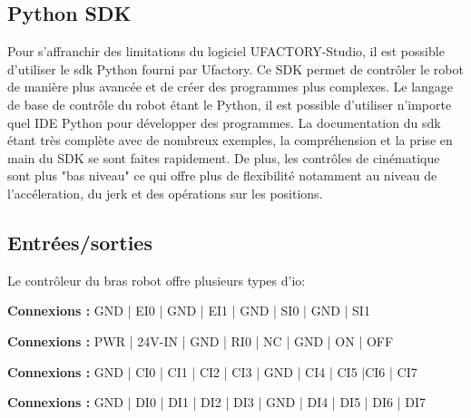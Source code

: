 \subsection{Python SDK}
Pour s'affranchir des limitations du logiciel UFACTORY-Studio, il est possible d'utiliser le \gls{sdk} Python \cite{PythonSDK} fourni par Ufactory. Ce SDK permet de contrôler le robot de manière plus avancée et de créer des programmes plus complexes. Le langage de base de contrôle du robot étant le Python, il est possible d'utiliser n'importe quel \gls{IDE} Python pour développer des programmes. La documentation du \gls{sdk} étant très complète avec de nombreux exemples, la compréhension et la prise en main du SDK se sont faites rapidement. De plus, les contrôles de cinématique sont plus "bas niveau" ce qui offre plus de flexibilité notamment au niveau de l'accéleration, du \gls{jerk} et des opérations sur les positions.

\subsection{Entrées/sorties}
Le contrôleur du bras robot offre plusieurs types d'\gls{io}:


\begin{tcolorbox}[colframe=black, colback=SafetyColor, title=Safety]
    \textbf{Connexions :} GND | EI0 | GND | EI1 | GND | SI0 | GND | SI1
\end{tcolorbox}

\begin{tcolorbox}[colframe=black, colback=PowerColor, title=Power]
    \textbf{Connexions :} PWR | 24V-IN | GND | RI0 | NC | GND | ON | OFF
\end{tcolorbox}

\begin{tcolorbox}[colframe=black, colback=ConfigInputColor, title=Configurable Inputs]
    \textbf{Connexions :} GND | CI0 | CI1 | CI2 | CI3 | GND | CI4 | CI5 |CI6 | CI7
\end{tcolorbox}

\begin{tcolorbox}[colframe=black, colback=DigitalInputColor, title=Digital Inputs]
    \textbf{Connexions :} GND |  DI0 | DI1 | DI2 | DI3 | GND | DI4 | DI5 | DI6 | DI7
\end{tcolorbox}

